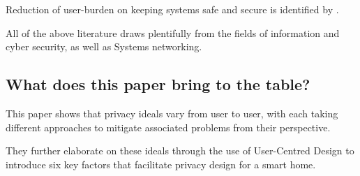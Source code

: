 Reduction of user-burden on keeping systems safe and secure is identified by \textcite{23}.

All of the above literature draws plentifully from the fields of information and cyber security,  as well as Systems networking.

\subsection{What does this paper bring to the table?}

This paper shows that privacy ideals vary from user to user, with each taking different approaches to mitigate associated problems from their perspective. 

They further elaborate on these ideals through the use of User-Centred Design to introduce six key factors that facilitate privacy design for a smart home.
